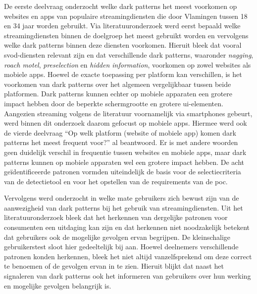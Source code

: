 De eerste deelvraag onderzocht welke dark patterns het meest voorkomen op websites en apps van populaire streamingdiensten die door Vlamingen tussen 18 en 34 jaar worden gebruikt. Via literatuuronderzoek werd eerst bepaald welke streamingdiensten binnen de doelgroep het meest gebruikt worden en vervolgens welke dark patterns binnen deze diensten voorkomen. Hieruit bleek dat vooral \acrlong{svod}-diensten relevant zijn en dat verschillende dark patterns, waaronder \textit{nagging}, \textit{roach motel}, \textit{preselection} en \textit{hidden information}, voorkomen op zowel websites als mobiele apps. Hoewel de exacte toepassing per platform kan verschillen, is het voorkomen van dark patterns over het algemeen vergelijkbaar tussen beide platformen. Dark patterns kunnen echter op mobiele apparaten een grotere impact hebben door de beperkte schermgrootte en grotere \acrshort{ui}-elementen. Aangezien streaming volgens de literatuur voornamelijk via smartphones gebeurt, werd binnen dit onderzoek daarom gefocust op mobiele apps. Hiermee werd ook de vierde deelvraag ``Op welk platform (website of mobiele app) komen dark patterns het meest frequent voor?'' al beantwoord. Er is met andere woorden geen duidelijk verschil in frequentie tussen websites en mobiele apps, maar dark patterns kunnen op mobiele apparaten wel een grotere impact hebben. De acht geïdentificeerde patronen vormden uiteindelijk de basis voor de selectiecriteria van de detectietool en voor het opstellen van de requirements van de \acrshort{poc}.

\vspace{1em}

Vervolgens werd onderzocht in welke mate gebruikers zich bewust zijn van de aanwezigheid van dark patterns bij het gebruik van streamingdiensten. Uit het literatuuronderzoek bleek dat het herkennen van dergelijke patronen voor consumenten een uitdaging kan zijn en dat herkennen niet noodzakelijk betekent dat gebruikers ook de mogelijke gevolgen ervan begrijpen. De kleinschalige gebruikerstest sloot hier gedeeltelijk bij aan. Hoewel deelnemers verschillende patronen konden herkennen, bleek het niet altijd vanzelfsprekend om deze correct te benoemen of de gevolgen ervan in te zien. Hieruit blijkt dat naast het signaleren van dark patterns ook het informeren van gebruikers over hun werking en mogelijke gevolgen belangrijk is.

